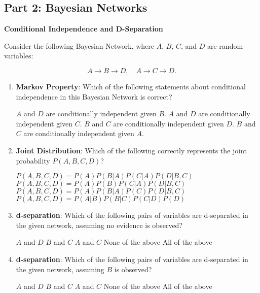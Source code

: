 \documentclass[12pt,letterpaper, onecolumn]{exam}
\begin{document}
\begin{questions}
\clearpage
\section*{Part 2: Bayesian Networks}
\question[20 points]\textbf{Conditional Independence and D-Separation}\droppoints

Consider the following Bayesian Network, where \( A \), \( B \), \( C \), and \( D \) are random variables:

\[
A \to B \to D, \quad A \to C \to D.
\]

\begin{enumerate}[label=(\alph*)]
    \item \textbf{Markov Property}: Which of the following statements about conditional independence in this Bayesian Network is correct?
    \begin{choices}
        \choice \( A \) and \( D \) are conditionally independent given \( B \).
        \choice \( A \) and \( D \) are conditionally independent given \( C \).
        \choice \( B \) and \( C \) are conditionally independent given \( D \).
        \choice \( B \) and \( C \) are conditionally independent given \( A \).
    \end{choices}

    \item \textbf{Joint Distribution}: Which of the following correctly represents the joint probability \( P(A, B, C, D) \)?
    \begin{choices}
        \choice \( P(A, B, C, D) = P(A)P(B|A)P(C|A)P(D|B, C) \)
        \choice \( P(A, B, C, D) = P(A)P(B)P(C|A)P(D|B, C) \)
        \choice \( P(A, B, C, D) = P(A)P(B|A)P(C)P(D|B, C) \)
        \choice \( P(A, B, C, D) = P(A|B)P(B|C)P(C|D)P(D) \)
    \end{choices}

    \item \textbf{d-separation}: Which of the following pairs of variables are d-separated in the given network, assuming no evidence is observed?
    \begin{choices}
        \choice \( A \) and \( D \)
        \choice \( B \) and \( C \)
        \choice \( A \) and \( C \)
        \choice None of the above
        \choice All of the above
    \end{choices}
    
    \item \textbf{d-separation}: Which of the following pairs of variables are d-separated in the given network, assuming $B$ is observed?
    \begin{choices}
        \choice \( A \) and \( D \)
        \choice \( B \) and \( C \)
        \choice \( A \) and \( C \)
        \choice None of the above
        \choice All of the above
    \end{choices}
        

\end{enumerate}
\end{questions}
\end{document}
